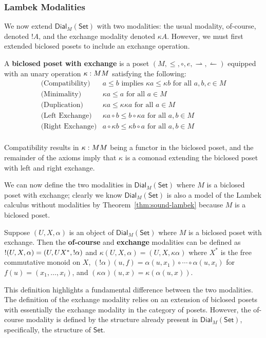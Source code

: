 \documentclass{llncs}
\let\to\relax                   %
\newcommand{\to}{\rightarrow}
\newcommand{\rto}{\leftharpoonup}
\newcommand{\lto}{\rightharpoonup}
\newcommand{\Set}{\mathsf{Set}}
\newcommand{\Dial}[2]{\mathsf{Dial}_{#1}(#2)}
\begin{document}
\subsubsection{Lambek Modalities}
\label{subsec:modalities}
We now extend $\Dial{M}{\Set}$ with two modalities: the usual
modality, of-course, denoted $!A$, and the exchange modality denoted
$\kappa A$.  However, we must first extended biclosed posets to
include an exchange operation.

\begin{definition}
  \label{def:biclosed-exchange}
  A \textbf{biclosed poset with exchange} is a poset $(M, \leq, \circ,
  e, \lto, \rto)$ equipped with an unary operation $\kappa : M \to M$
  satisfying the following:
  \[
  \begin{array}{clr}
    \text{(Compatibility)} & a \leq b \text{ implies } \kappa a \leq \kappa b \text{ for all } a,b,c \in M\\
    \text{(Minimality)} & \kappa a \leq a \text{ for all } a \in M\\
    \text{(Duplication)} & \kappa a \leq \kappa\kappa a \text{ for all } a \in M\\
    \text{(Left Exchange)} & \kappa a \circ b \leq b \circ \kappa a \text{ for all } a, b \in M\\
    \text{(Right Exchange)} & a \circ \kappa b \leq \kappa b \circ a \text{ for all } a, b \in M\\
  \end{array}
  \]
\end{definition}
\noindent
Compatibility results in $\kappa : M \to M$ being a functor in the
biclosed poset, and the remainder of the axioms imply that $\kappa$ is
a comonad extending the biclosed poset with left and right exchange.

We can now define the two modalities in $\Dial{M}{\Set}$ where $M$ is
a biclosed poset with exchange; clearly we know $\Dial{M}{\Set}$ is
also a model of the Lambek calculus without modalities by
Theorem~\ref{thm:sound-lambek} because $M$ is a biclosed poset.
\begin{definition}
  \label{def:modalities-dial}
  Suppose $(U, X, \alpha)$ is an object of $\Dial{M}{\Set}$ where $M$
  is a biclosed poset with exchange. Then the \textbf{of-course} and
  \textbf{exchange} modalities can be defined as 
  $! (U, X, \alpha) = (U, U \to X^*, !\alpha)$ and
  $\kappa (U, X, \alpha) = (U, X, \kappa \alpha)$
  where $X^*$ is the free commutative monoid on $X$, $(!\alpha)(u, f)
  = \alpha(u, x_1) \circ \cdots \circ \alpha(u, x_i)$ for $f(u) =
  (x_1, \ldots, x_i)$, and $(\kappa \alpha)(u, x) = \kappa (\alpha(u,
  x))$.
\end{definition}
This definition highlights a fundamental difference between the two
modalities.  The definition of the exchange modality relies on an
extension of biclosed posets with essentially the exchange modality in
the category of posets.  However, the of-course modality is defined by
the structure already present in $\Dial{M}{\Set}$, specifically, the
structure of $\Set$.
\end{document}
